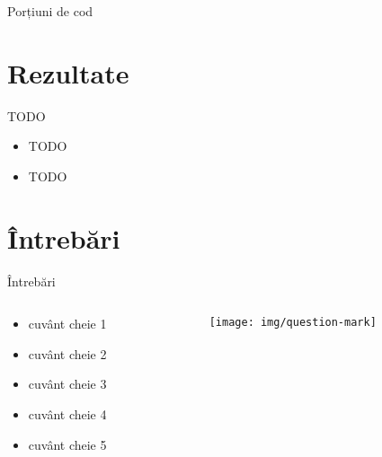 \documentclass{beamer}
\begin{document}
\begin{frame}{Porțiuni de cod}
	
\end{frame}
	
\section{Rezultate}

\begin{frame}{TODO}
	\begin{itemize}
		\item TODO
		\item TODO
	\end{itemize}
\end{frame}

\section{\^{I}ntrebări}

\begin{frame}{Întrebări}
  \begin{columns}
    \begin{column}[l]{0.5\textwidth}
      \begin{itemize}
        \item cuvânt cheie 1
        \item cuvânt cheie 2
        \item cuvânt cheie 3
        \item cuvânt cheie 4
        \item cuvânt cheie 5
      \end{itemize}
    \end{column}
    \begin{column}[c]{0.5\textwidth}
      \begin{figure}
        \texttt{[image: img/question-mark]}
      \end{figure}
    \end{column}
  \end{columns}
\end{frame}
\end{document}
